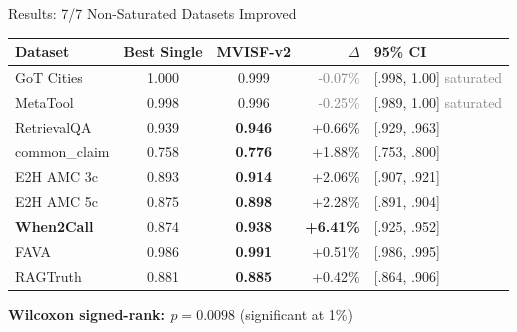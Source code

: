 \documentclass[aspectratio=169,14pt]{beamer}
\begin{document}
\begin{frame}{Results: 7/7 Non-Saturated Datasets Improved}

\centering
\small
\begin{tabular}{l c c r l}
\toprule
\textbf{Dataset} & \textbf{Best Single} & \textbf{MVISF-v2} & \textbf{$\Delta$} & \textbf{95\% CI} \\
\midrule
GoT Cities & 1.000 & 0.999 & \textcolor{gray}{-0.07\%} & {\scriptsize [.998, 1.00] \textcolor{gray}{saturated}} \\
MetaTool & 0.998 & 0.996 & \textcolor{gray}{-0.25\%} & {\scriptsize [.989, 1.00] \textcolor{gray}{saturated}} \\
\midrule
RetrievalQA & 0.939 & \textbf{0.946} & \textcolor{wingreen}{+0.66\%} & {\scriptsize [.929, .963]} \\
common\_claim & 0.758 & \textbf{0.776} & \textcolor{wingreen}{+1.88\%} & {\scriptsize [.753, .800]} \\
E2H AMC 3c & 0.893 & \textbf{0.914} & \textcolor{wingreen}{+2.06\%} & {\scriptsize [.907, .921]} \\
E2H AMC 5c & 0.875 & \textbf{0.898} & \textcolor{wingreen}{+2.28\%} & {\scriptsize [.891, .904]} \\
\textbf{When2Call} & 0.874 & \textbf{0.938} & \textcolor{wingreen}{\textbf{+6.41\%}} & {\scriptsize [.925, .952]} \\
FAVA & 0.986 & \textbf{0.991} & \textcolor{wingreen}{+0.51\%} & {\scriptsize [.986, .995]} \\
RAGTruth & 0.881 & \textbf{0.885} & \textcolor{wingreen}{+0.42\%} & {\scriptsize [.864, .906]} \\
\bottomrule
\end{tabular}

\vspace{0.8em}
\textbf{Wilcoxon signed-rank: $p = 0.0098$} {\small (significant at 1\%)}

\end{frame}
\end{document}
